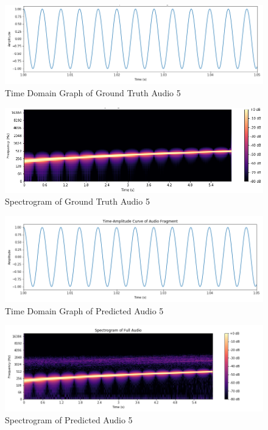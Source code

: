 \documentclass{ioereport}
\begin{document}
    \begin{figure}[H]
        \centering
        \includegraphics[width=\linewidth]{assets/audio_results/sweeping_tone200-500hztime.png}
        \caption{Time Domain Graph of Ground Truth Audio 5}
        \label{fig:gt-sweeping-time}
    \end{figure}
    \begin{figure}[H]
        \centering
        \includegraphics[width=\linewidth]{assets/audio_results/sweeping_tone200-500hzspec.png}
        \caption{Spectrogram of Ground Truth Audio 5}
        \label{fig:gt-sweeping-spec}
    \end{figure}
    
    \begin{figure}[H]
        \centering
        \includegraphics[width=\linewidth]{assets/audio_results/Predsweeping_tone200-500hztime.png}
        \caption{Time Domain Graph of Predicted Audio 5}
        \label{fig:pred-sweeping-time}
    \end{figure}
    \begin{figure}[H]
        \centering
        \includegraphics[width=\linewidth]{assets/audio_results/Predsweeping_tone200-500hzspec.png}
        \caption{Spectrogram of Predicted Audio 5}
        \label{fig:pred-sweeping-spec}
    \end{figure}
\end{document}
